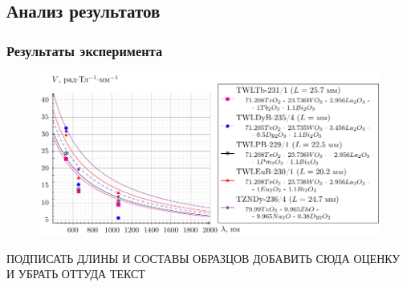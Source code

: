 \documentclass[10pt,pdf,hyperref={unicode}, dvipsnames, handout]{beamer}
\begin{document}
\begin{frame}[t]
	\subsection{Анализ результатов}
	\frametitle{Результаты эксперимента}
	\begin{figure}[tb]
		\centering
		\includegraphics[width=1\textwidth]{images/graph_verde_from_lambda}
	\end{figure}
	ПОДПИСАТЬ ДЛИНЫ И СОСТАВЫ ОБРАЗЦОВ
	ДОБАВИТЬ СЮДА ОЦЕНКУ И УБРАТЬ ОТТУДА ТЕКСТ
	
\end{frame}
\end{document}
